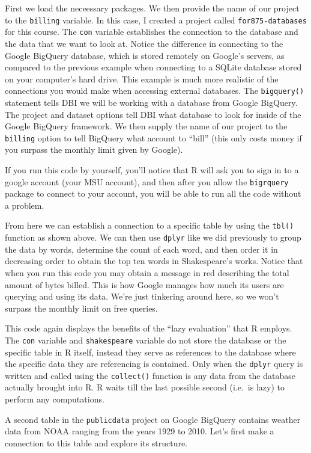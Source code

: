 \documentclass[
]{krantz}
\begin{document}
First we load the neceessary packages. We then provide the name of our project to the \texttt{billing} variable. In this case, I created a project called \texttt{for875-databases} for this course. The \texttt{con} variable establishes the connection to the database and the data that we want to look at. Notice the difference in connecting to the Google BigQuery database, which is stored remotely on Google's servers, as compared to the previous example when connecting to a SQLite database stored on your computer's hard drive. This example is much more realistic of the connections you would make when accessing external databases. The \texttt{bigquery()} statement tells DBI we will be working with a database from Google BigQuery. The project and dataset options tell DBI what database to look for inside of the Google BigQuery framework. We then supply the name of our project to the \texttt{billing} option to tell BigQuery what account to ``bill'' (this only costs money if you surpass the monthly limit given by Google).

If you run this code by yourself, you'll notice that R will ask you to sign in to a google account (your MSU account), and then after you allow the \texttt{bigrquery} package to connect to your account, you will be able to run all the code without a problem.

From here we can establish a connection to a specific table by using the \texttt{tbl()} function as shown above. We can then use \texttt{dplyr} like we did previously to group the data by words, determine the count of each word, and then order it in decreasing order to obtain the top ten words in Shakespeare's works. Notice that when you run this code you may obtain a message in red describing the total amount of bytes billed. This is how Google manages how much its users are querying and using its data. We're just tinkering around here, so we won't surpass the monthly limit on free queries.

This code again displays the benefits of the ``lazy evaluation'' that R employs. The \texttt{con} variable and \texttt{shakespeare} variable do not store the database or the specific table in R itself, instead they serve as references to the database where the specific data they are referencing is contained. Only when the \texttt{dplyr} query is written and called using the \texttt{collect()} function is any data from the database actually brought into R. R waits till the last possible second (i.e.~is lazy) to perform any computations.

A second table in the \texttt{publicdata} project on Google BigQuery contains weather data from NOAA ranging from the years 1929 to 2010. Let's first make a connection to this table and explore its structure.
\end{document}
